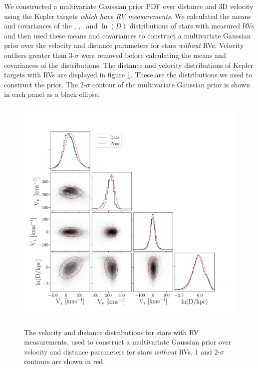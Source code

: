 We constructed a multivariate Gaussian prior PDF over distance and 3D velocity
using the Kepler targets {\it which have RV measurements}.
We calculated the means and covariances of the \vx, \vy, \vz\ and $\ln(D)$
distributions of stars with measured RVs and then used these means and
covariances to construct a multivariate Gaussian prior over the velocity and
distance parameters for stars {\it without} RVs.
Velocity outliers greater than 3-$\sigma$ were removed before calculating the
means and covariances of the distributions.
The distance and velocity distributions of Kepler targets with RVs are
displayed in figure \ref{fig:prior_distributions_2D}.
These are the distributions we used to construct the prior.
The 2-$\sigma$ contour of the multivariate Gaussian prior is shown in each
panel as a black ellipse.
\begin{figure}[ht!]
\caption{
The velocity and distance distributions for stars with RV measurements,
    used to construct a multivariate Gaussian prior over velocity and
    distance parameters for stars {\it without} RVs.
1 and 2-$\sigma$ contours are shown in red.
}
  \centering
    \includegraphics[width=.8\textwidth]{prior_distributions_2D}
\label{fig:prior_distributions_2D}
\end{figure}

